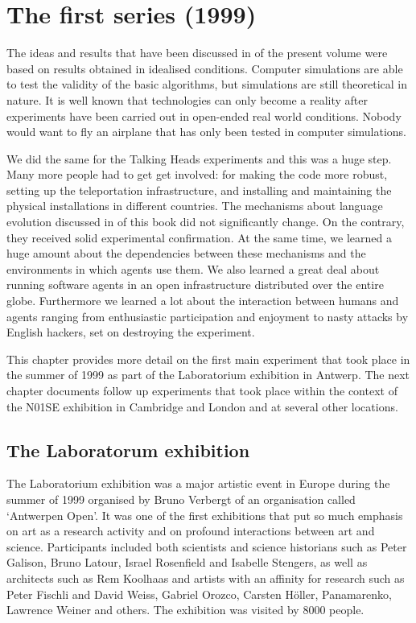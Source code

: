 \chapter{The first series (1999)}
\label{c:first-series}

The ideas and results that have been discussed in  of the present volume 
were based on results obtained in idealised conditions. Computer simulations are able to 
test the validity of the basic algorithms, but simulations are still theoretical in nature. 
It is well known that technologies can only become a reality after 
experiments have been carried out in open-ended real world conditions. Nobody would want to fly an airplane that 
has only been tested in computer simulations. 

We did the same for the Talking Heads experiments and this was a huge step. Many more people had to get
get involved: for making the code more robust, setting up the teleportation infrastructure, and installing and 
maintaining the physical installations in different countries.  
The mechanisms about language evolution discussed in  of this book did not significantly change. On the contrary, 
they received solid experimental confirmation. At the same time, we learned a huge amount about the dependencies
between these mechanisms and the environments in which agents use them. We also learned a great deal about running software 
agents in an open infrastructure distributed over the entire globe. Furthermore we learned a lot 
about the interaction between humans and agents ranging from 
enthusiastic participation and enjoyment to nasty attacks by English hackers, set on destroying the experiment. 

This chapter provides more detail on the first main experiment that took place in the summer of 1999 as 
part of the Laboratorium exhibition in Antwerp. The next chapter documents follow up experiments that took place
within the context of the N01SE exhibition in Cambridge and London and at several other locations. 

\section{The Laboratorum exhibition} 

The Laboratorium
exhibition was a major artistic event in Europe during the summer of 1999 organised by 
Bruno Verbergt of an organisation called `Antwerpen Open'.
It was one of the first exhibitions that put so much emphasis on art as a research 
activity and on profound interactions between art and science.
Participants included both scientists and science historians such as Peter Galison, Bruno Latour, Israel Rosenfield
and Isabelle Stengers, as well as architects such as Rem Koolhaas and artists with an affinity for research 
such as Peter Fischli and David Weiss, Gabriel Orozco, Carsten H\"oller, Panamarenko, Lawrence Weiner and others. 
The exhibition was visited by 8000 people. 

